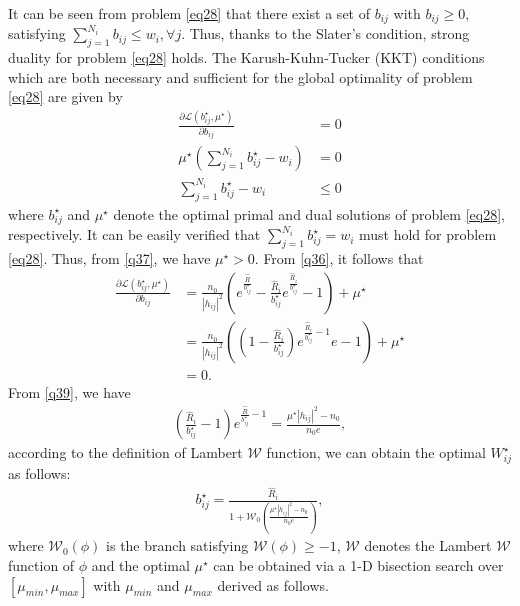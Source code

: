 \documentclass[journal]{IEEEtran}
\begin{document}
It can be seen from problem \eqref{eq28} that there exist a set of $b_{ij}$ with $b_{ij} \geq 0$, satisfying $\sum\limits_{j = 1}^{N_i} b_{ij} \leq w_i, \forall j$. Thus, thanks to the Slater's condition, strong duality for problem \eqref{eq28} holds. The Karush-Kuhn-Tucker (KKT) conditions which are both necessary and 	sufficient for the  global optimality of problem \eqref{eq28} are given by
\begin{align}
\frac{\partial \mathcal{L}\left({b_{ij}^\star}, \mu^\star\right)}{\partial b_{ij}} &= 0 \label{q36} \\
\mu^\star\left(\sum\limits_{j = 1}^{N_i}b_{ij}^\star - w_i\right) &= 0 \label{q37} \\
\sum\limits_{j = 1}^{N_i}b_{ij}^\star - w_i & \leq 0 \label{q38}
\end{align} 
where $b_{ij}^\star$ and $\mu^\star$ denote the optimal primal and dual solutions of problem \eqref{eq28}, respectively. It can be easily verified that $\sum\limits_{j = 1}^{N_i} b_{ij}^\star = w_i$ must hold for problem \eqref{eq28}. Thus, from \eqref{q37}, we have $\mu^\star > 0$. From \eqref{q36}, it follows that 
\begin{align}
\frac{\partial \mathcal{L} \left(b_{ij}^\star, \mu^\star \right)}{\partial b_{ij}} &= \frac{n_0}{\left|h_{ij}\right|^2} \left(e^{\frac{\hat{R}}{b_{ij}^\star}} -  \frac{\hat{R}_i}{b_{ij}^\star} e^{\frac{\hat{R}_i}{b_{ij}^\star}} - 1\right) + \mu^\star \nonumber \\
& =  \frac{n_0}{\left|h_{ij}\right|^2}\left(\left(1 - \frac{\hat{R}_i}{b_{ij}^\star}\right)e^{\frac{\hat{R}_i}{b_{ij}^\star} - 1}e - 1\right) + \mu^\star \nonumber \\
& = 0. \label{q39}
\end{align}
From \eqref{q39}, we have
\begin{align}
\left(\frac{\hat{R}_i}{b_{ij}^\star} - 1\right) e^{\frac{\hat{R}}{b_{ij}^\star} - 1} = \frac{\mu^\star \left|h_{ij}\right|^2 - n_0}{n_0 e},
\end{align}
according to the definition of Lambert $\mathcal{W}$ function, we can obtain the optimal $W_{ij}^\star$ as follows:
\begin{align}
b_{ij}^\star = \frac{\hat{R}_i}{1 + \mathcal{W}_0\left(\frac{\mu^\star \left|h_{ij}\right|^2 - n_0}{n_0 e}\right)} \label{q41},
\end{align}
where $\mathcal{W}_0\left(\phi\right)$ is the branch satisfying $\mathcal{W}\left(\phi\right) \geq -1$, $\mathcal{W}$ denotes the Lambert $\mathcal{W}$ function of $\phi$ \cite{RMCorless} and the optimal $\mu^\star$ can be obtained via a 1-D bisection search over $\left[\mu_{min}, \mu_{max}\right]$ with $\mu_{min} $ and $\mu_{max}$ derived as follows.
\end{document}
